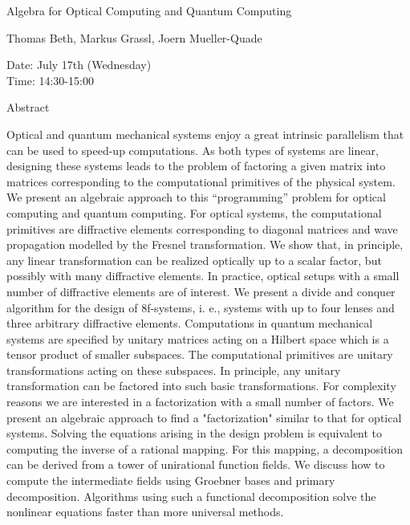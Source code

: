 \begin{center}
\LARGE
Algebra for Optical Computing and Quantum Computing
\end{center}

\begin{center}
\Large
Thomas Beth, Markus Grassl, Joern Mueller-Quade

\end{center}

\noindent
Date:  July 17th (Wednesday)\\
Time: 14:30-15:00\\

\begin{center}
\large
Abstract
\end{center}

Optical and quantum mechanical systems enjoy a great intrinsic parallelism that can be used to
speed-up computations. As both types of systems are linear, designing these systems leads to the
problem of factoring a given matrix into matrices corresponding to the computational primitives
of the physical system. 
We present an algebraic approach to this ``programming'' problem for optical computing and
quantum computing. 
For optical systems, the computational primitives are diffractive elements corresponding to
diagonal matrices and wave propagation modelled by the Fresnel transformation. We show that, in
principle, any linear transformation can be realized optically up to a scalar factor, but possibly
with many diffractive elements. In practice, optical setups with a small number of diffractive
elements are of interest. We present a divide and conquer algorithm for the design of 8f-systems,
i. e., systems with up to four lenses and three arbitrary diffractive elements. 
Computations in quantum mechanical systems are specified by unitary matrices acting on a Hilbert
space which is a tensor product of smaller subspaces. The computational primitives are unitary
transformations acting on these subspaces. In principle, any unitary transformation can be factored
into such basic transformations. For complexity reasons we are interested in a factorization with a
small number of factors. We present an algebraic approach to find a "factorization" similar to that
for optical systems. 
Solving the equations arising in the design problem is equivalent to computing the inverse of a
rational mapping. For this mapping, a decomposition can be derived from a tower of unirational
function fields. We discuss how to compute the intermediate fields using Groebner bases and
primary decomposition. Algorithms using such a functional decomposition solve the nonlinear
equations faster than more universal methods. 

